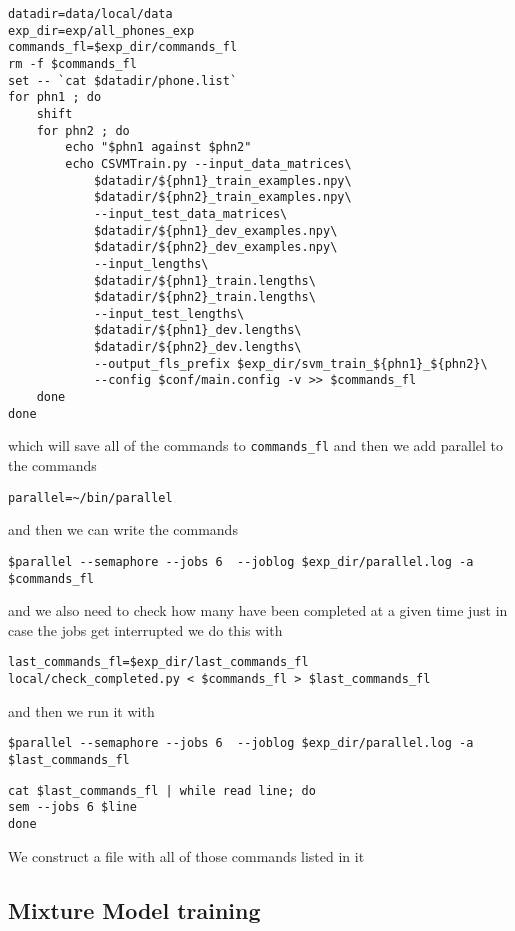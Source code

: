 \documentclass{article}
\begin{document}
\begin{verbatim}
datadir=data/local/data
exp_dir=exp/all_phones_exp
commands_fl=$exp_dir/commands_fl
rm -f $commands_fl
set -- `cat $datadir/phone.list`
for phn1 ; do
    shift
    for phn2 ; do
        echo "$phn1 against $phn2"
        echo CSVMTrain.py --input_data_matrices\
            $datadir/${phn1}_train_examples.npy\
            $datadir/${phn2}_train_examples.npy\
            --input_test_data_matrices\
            $datadir/${phn1}_dev_examples.npy\
            $datadir/${phn2}_dev_examples.npy\
            --input_lengths\
            $datadir/${phn1}_train.lengths\
            $datadir/${phn2}_train.lengths\
            --input_test_lengths\
            $datadir/${phn1}_dev.lengths\
            $datadir/${phn2}_dev.lengths\
            --output_fls_prefix $exp_dir/svm_train_${phn1}_${phn2}\
            --config $conf/main.config -v >> $commands_fl
    done
done
\end{verbatim}
which will save all of the commands to
\texttt{commands_fl}
and then we add parallel to the commands
\begin{verbatim}
parallel=~/bin/parallel
\end{verbatim}
and then we can write the commands
\begin{verbatim}
$parallel --semaphore --jobs 6  --joblog $exp_dir/parallel.log -a $commands_fl
\end{verbatim}
and we also need to check how many have been completed at a given
time just in case the jobs get interrupted
we do this with
\begin{verbatim}
last_commands_fl=$exp_dir/last_commands_fl
local/check_completed.py < $commands_fl > $last_commands_fl
\end{verbatim}
and then we run it with
\begin{verbatim}
$parallel --semaphore --jobs 6  --joblog $exp_dir/parallel.log -a $last_commands_fl
\end{verbatim}
\begin{verbatim}
cat $last_commands_fl | while read line; do
sem --jobs 6 $line
done

\end{verbatim}
We construct a file with all of those commands listed in it 

\subsection{Mixture Model training}
\end{document}
